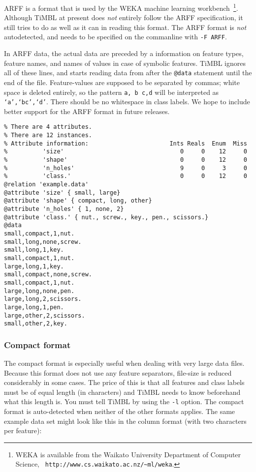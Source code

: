 \documentclass{report}
\begin{document}
ARFF is a format that is used by the WEKA machine learning
workbench~\cite{Garner95,Witten+99}\footnote{WEKA is available from
the Waikato University Department of Computer Science, {\tt
http://www.cs.waikato.ac.nz/\~{}ml/weka}.}.  Although TiMBL at present
does {\em not}\/ entirely follow the ARFF specification, it still
tries to do as well as it can in reading this format. The ARFF format
is {\em not}\/ autodetected, and needs to be specified on the
commanline with {\tt -F ARFF}.


In ARFF data, the actual data are preceded by a information on feature
types, feature names, and names of values in case of symbolic
features. TiMBL ignores all of these lines, and starts reading data
from after the {\tt @data} statement until the end of the
file. Feature-values are supposed to be separated by commas; white
space is deleted entirely, so the pattern {\tt a, b c,d} will be
interpreted as {\tt `a',`bc',`d'}. There should be no whitespace in
class labels.  We hope to include better support for the ARFF format
in future releases.

\begin{footnotesize}
\begin{verbatim}
% There are 4 attributes.
% There are 12 instances.
% Attribute information:                       Ints Reals  Enum  Miss
%          'size'                                 0     0    12     0   
%          'shape'                                0     0    12     0   
%          'n_holes'                              9     0     3     0   
%          'class.'                               0     0    12     0   
@relation 'example.data'
@attribute 'size' { small, large}
@attribute 'shape' { compact, long, other}
@attribute 'n_holes' { 1, none, 2}
@attribute 'class.' { nut., screw., key., pen., scissors.}
@data
small,compact,1,nut.
small,long,none,screw.
small,long,1,key.
small,compact,1,nut.
large,long,1,key.
small,compact,none,screw.
small,compact,1,nut.
large,long,none,pen.
large,long,2,scissors.
large,long,1,pen.
large,other,2,scissors.
small,other,2,key.
\end{verbatim}
\end{footnotesize}

\subsubsection{Compact format}
\label{compactformat}

The compact format is especially useful when dealing with very large
data files. Because this format does not use any feature separators,
file-size is reduced considerably in some cases. The price of this is
that all features and class labels must be of equal length (in
characters) and TiMBL needs to know beforehand what this length
is. You must tell TiMBL by using the {\tt -l} option. The compact
format is auto-detected when neither of the other formats applies. The
same example data set might look like this in the column format (with
two characters per feature):
\end{document}
